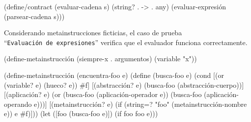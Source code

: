 \documentclass[10pt,oneside,openany,letterpaper]{book}
\begin{document}
\nwenddocs{}\plusendmoddef
(define/contract (evaluar-cadena s)
  (string? . -> . any)
  (evaluar-expresión (parsear-cadena s)))
\eatline
{}\nwendcode{}\nwdocspar

Considerando metainstrucciones ficticias, el caso de prueba ``{\tt{}Evaluación\ de\ expresiones}'' verifica que el evaluador funciona correctamente.

\nwenddocs{}\plusendmoddef
(define-metainstrucción (siempre-x . argumentos)
  (variable "x"))

(define-metainstrucción (encuentra-foo e)
  (define (busca-foo e)
    (cond [(or (variable? e) (hueco? e))
           #f]
          [(abstracción? e)
           (busca-foo (abstracción-cuerpo))]
          [(aplicación? e)
           (or (busca-foo (aplicación-operador e))
               (busca-foo (aplicación-operando e)))]
          [(metainstrucción? e)
           (if (string=? "foo" (metainstrucción-nombre e)) e #f)]))
  (let ([foo (busca-foo e)])
    (if foo foo e)))
\end{document}

